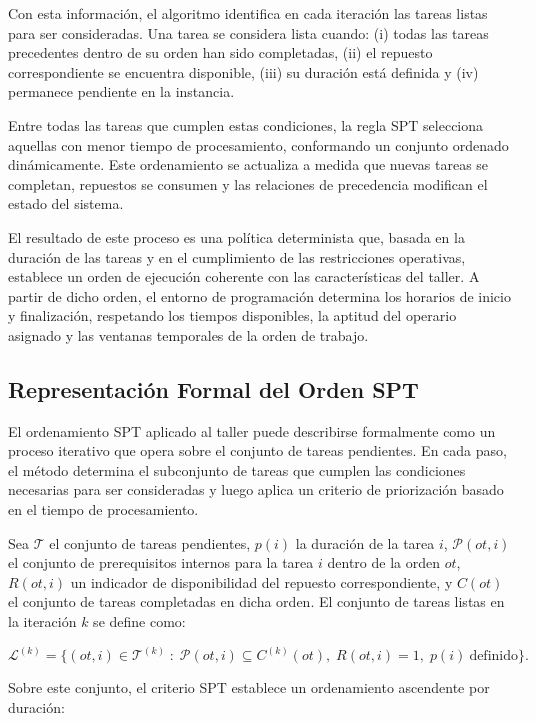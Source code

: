 Con esta información, el algoritmo identifica en cada iteración las tareas listas para ser 
consideradas. Una tarea se considera lista cuando: (i) todas las tareas precedentes dentro 
de su orden han sido completadas, (ii) el repuesto correspondiente se encuentra disponible, 
(iii) su duración está definida y (iv) permanece pendiente en la instancia.

Entre todas las tareas que cumplen estas condiciones, la regla SPT selecciona aquellas con 
menor tiempo de procesamiento, conformando un conjunto ordenado dinámicamente. Este 
ordenamiento se actualiza a medida que nuevas tareas se completan, repuestos se consumen y 
las relaciones de precedencia modifican el estado del sistema.

El resultado de este proceso es una política determinista que, basada en la duración de las 
tareas y en el cumplimiento de las restricciones operativas, establece un orden de ejecución 
coherente con las características del taller. A partir de dicho orden, el entorno de 
programación determina los horarios de inicio y finalización, respetando los tiempos 
disponibles, la aptitud del operario asignado y las ventanas temporales de la orden de 
trabajo.

\subsection{Representación Formal del Orden SPT}

El ordenamiento SPT aplicado al taller puede describirse formalmente como un proceso 
iterativo que opera sobre el conjunto de tareas pendientes. En cada paso, el método 
determina el subconjunto de tareas que cumplen las condiciones necesarias para ser 
consideradas y luego aplica un criterio de priorización basado en el tiempo de 
procesamiento.

Sea $\mathcal{T}$ el conjunto de tareas pendientes, $p(i)$ la duración de la tarea $i$, 
$\mathcal{P}(ot,i)$ el conjunto de prerequisitos internos para la tarea $i$ dentro de la 
orden $ot$, $R(ot,i)$ un indicador de disponibilidad del repuesto correspondiente, y 
$C(ot)$ el conjunto de tareas completadas en dicha orden. El conjunto de tareas listas en 
la iteración $k$ se define como:

\[
\mathcal{L}^{(k)} = 
\Big\{ (ot,i) \in \mathcal{T}^{(k)} \; : \;
\mathcal{P}(ot,i) \subseteq C^{(k)}(ot), \;
R(ot,i)=1, \;
p(i)\ \text{definido} \Big\}.
\]

Sobre este conjunto, el criterio SPT establece un ordenamiento ascendente por duración:

